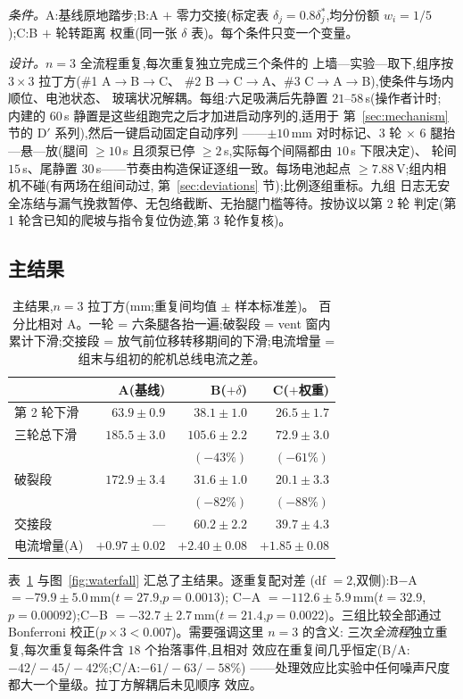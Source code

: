 \documentclass[journal]{IEEEtran}
\newcommand{\dstar}{\delta^{*}}
\begin{document}
\emph{条件。}A:基线原地踏步;B:A $+$ 零力交接(标定表
$\delta_j = 0.8\dstar_j$,均分份额 $w_i = 1/5$);C:B $+$ 轮转距离
权重(同一张 $\delta$ 表)。每个条件只变一个变量。

\emph{设计。}$n{=}3$ 全流程重复,每次重复独立完成三个条件的
上墙—实验—取下,组序按 $3\times3$ 拉丁方(\#1 A$\to$B$\to$C、
\#2 B$\to$C$\to$A、\#3 C$\to$A$\to$B),使条件与场内顺位、电池状态、
玻璃状况解耦。每组:六足吸满后先静置 $21$--$58$\,s(操作者计时;
内建的 $60$\,s 静置是这些组跑完之后才加进启动序列的,适用于
第~\ref{sec:mechanism} 节的 D$'$ 系列),然后一键启动固定自动序列
——$\pm10$\,mm 对时标记、$3$ 轮 $\times$ $6$ 腿抬—悬—放(腿间
$\ge10$\,s 且须泵已停 $\ge2$\,s,实际每个间隔都由 $10$\,s 下限决定)、
轮间 $15$\,s、尾静置 $30$\,s——节奏由构造保证逐组一致。每场电池起点
$\ge7.88$\,V;组内相机不碰(有两场在组间动过,
第~\ref{sec:deviations} 节);比例逐组重标。九组
日志无安全冻结与漏气挽救暂停、无包络截断、无抬腿门槛等待。按协议以第 2 轮
判定(第 1 轮含已知的爬坡与指令复位伪迹,第 3 轮作复核)。

\subsection{主结果}
\label{sec:results}

\begin{table}[t]
\caption{主结果,$n{=}3$ 拉丁方(mm;重复间均值 $\pm$ 样本标准差)。
百分比相对 A。一轮 = 六条腿各抬一遍;破裂段 = vent 窗内累计下滑;交接段
= 放气前位移转移期间的下滑;电流增量 = 组末与组初的舵机总线电流之差。}
\label{tab:main}
\centering
\footnotesize
\setlength{\tabcolsep}{3.5pt}
\begin{tabular}{@{}lrrr@{}}
\toprule
 & A(基线) & B($+\delta$) & C($+$权重) \\
\midrule
第 2 轮下滑 & $63.9\pm0.9$ & $38.1\pm1.0$ & $26.5\pm1.7$ \\
三轮总下滑 & $185.5\pm3.0$ & $105.6\pm2.2$ & $72.9\pm3.0$ \\
 & & $(-43\%)$ & $(-61\%)$ \\
破裂段 & $172.9\pm3.4$ & $31.6\pm1.0$ & $20.1\pm3.3$ \\
 & & $(-82\%)$ & $(-88\%)$ \\
交接段 & --- & $60.2\pm2.2$ & $39.7\pm4.3$ \\
电流增量(A) & $+0.97\pm0.02$ & $+2.40\pm0.08$ & $+1.85\pm0.08$ \\
\bottomrule
\end{tabular}
\end{table}

表~\ref{tab:main} 与图~\ref{fig:waterfall} 汇总了主结果。逐重复配对差
(df $=2$,双侧):B$-$A $=-79.9\pm5.0$\,mm($t=27.9$,$p=0.0013$);
C$-$A $=-112.6\pm5.9$\,mm($t=32.9$,$p=0.00092$);C$-$B
$=-32.7\pm2.7$\,mm($t=21.4$,$p=0.0022$)。三组比较全部通过
Bonferroni 校正($p\times3 < 0.007$)。需要强调这里 $n{=}3$ 的含义:
三次\emph{全流程}独立重复,每次重复每条件含 $18$ 个抬落事件,且相对
效应在重复间几乎恒定(B/A:$-42/-45/-42\%$;C/A:$-61/-63/-58\%$)
——处理效应比实验中任何噪声尺度都大一个量级。拉丁方解耦后未见顺序
效应。
\end{document}
